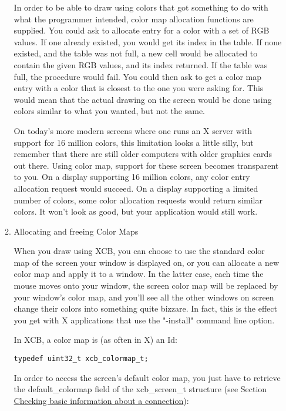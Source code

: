 \documentclass[12pt,oneside,titlepage]{book}
\begin{document}
\begin{enumerate}
\begin{enumerate}
    In order to be able to draw using colors that got something to do
    with what the programmer intended, color map allocation functions
    are supplied. You could ask to allocate entry for a color with a set
    of RGB values. If one already existed, you would get its index in
    the table. If none existed, and the table was not full, a new cell
    would be allocated to contain the given RGB values, and its index
    returned. If the table was full, the procedure would fail. You could
    then ask to get a color map entry with a color that is closest to
    the one you were asking for. This would mean that the actual drawing
    on the screen would be done using colors similar to what you wanted,
    but not the same.

    On today's more modern screens where one runs an X server with
    support for 16 million colors, this limitation looks a little silly,
    but remember that there are still older computers with older
    graphics cards out there. Using color map, support for these screen
    becomes transparent to you. On a display supporting 16 million
    colors, any color entry allocation request would succeed. On a
    display supporting a limited number of colors, some color allocation
    requests would return similar colors. It won't look as good, but
    your application would still work.
  \item
    \protect\hypertarget{colormapalloc}{}{Allocating and freeing Color
    Maps}

    When you draw using XCB, you can choose to use the standard color
    map of the screen your window is displayed on, or you can allocate a
    new color map and apply it to a window. In the latter case, each
    time the mouse moves onto your window, the screen color map will be
    replaced by your window's color map, and you'll see all the other
    windows on screen change their colors into something quite bizzare.
    In fact, this is the effect you get with X applications that use the
    "-install" command line option.

    In XCB, a color map is (as often in X) an Id:

\begin{verbatim}
typedef uint32_t xcb_colormap_t;
\end{verbatim}

    In order to access the screen's default color map, you just have to
    retrieve the {default\_colormap} field of the {xcb\_screen\_t}
    structure (see Section \protect\hyperlink{screen}{Checking basic
    information about a connection}):


\end{enumerate}
\end{enumerate}
\end{document}
